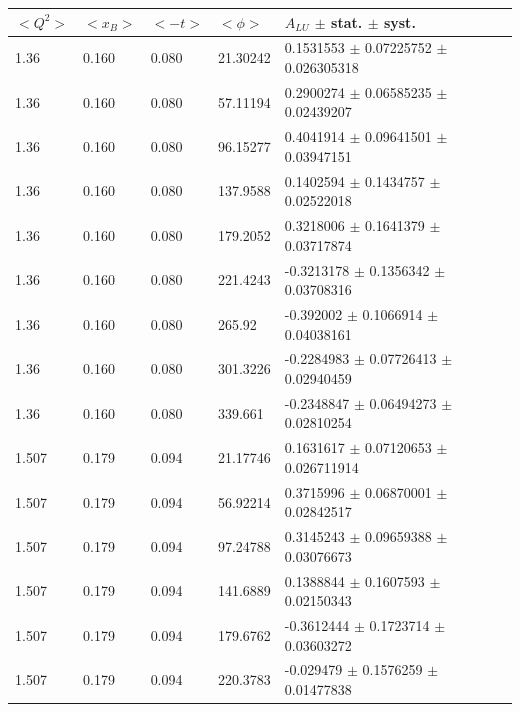\begin{table}[!h]
   \begin{center}
      \begin{tabular}{||l|l|l|l|l||}
         \hline
 $<Q^{2}>$ & $<x_{B}>$ & $<-t>$ & $<\phi>$ & $A_{LU}$ $\pm$ stat. $\pm$ syst.\\

         \hline
           1.36 & 0.160 & 0.080 &   21.30242  &  0.1531553   $\pm$  0.07225752   $\pm$  0.026305318    \\
           1.36 & 0.160 & 0.080 &   57.11194  &  0.2900274   $\pm$  0.06585235   $\pm$  0.02439207     \\
           1.36 & 0.160 & 0.080 &   96.15277  &  0.4041914   $\pm$  0.09641501   $\pm$  0.03947151     \\
           1.36 & 0.160 & 0.080 &   137.9588  &  0.1402594   $\pm$  0.1434757    $\pm$  0.02522018     \\
           1.36 & 0.160 & 0.080 &   179.2052  &  0.3218006   $\pm$  0.1641379    $\pm$  0.03717874     \\
           1.36 & 0.160 & 0.080 &   221.4243  &  -0.3213178  $\pm$  0.1356342    $\pm$  0.03708316     \\
           1.36 & 0.160 & 0.080 &   265.92    &  -0.392002   $\pm$  0.1066914    $\pm$  0.04038161     \\
           1.36 & 0.160 & 0.080 &   301.3226  &  -0.2284983  $\pm$  0.07726413   $\pm$  0.02940459     \\
           1.36 & 0.160 & 0.080 &   339.661   &  -0.2348847  $\pm$  0.06494273   $\pm$  0.02810254     \\
         \hline                                                                         
           1.507 & 0.179 & 0.094 &  21.17746   & 0.1631617   $\pm$  0.07120653   $\pm$  0.026711914     \\
           1.507 & 0.179 & 0.094 &  56.92214   & 0.3715996   $\pm$  0.06870001   $\pm$  0.02842517      \\
           1.507 & 0.179 & 0.094 &  97.24788   & 0.3145243   $\pm$  0.09659388   $\pm$  0.03076673      \\
           1.507 & 0.179 & 0.094 &  141.6889   & 0.1388844   $\pm$  0.1607593    $\pm$  0.02150343      \\
           1.507 & 0.179 & 0.094 &  179.6762   & -0.3612444  $\pm$  0.1723714    $\pm$  0.03603272      \\
           1.507 & 0.179 & 0.094 &  220.3783   & -0.029479   $\pm$  0.1576259    $\pm$  0.01477838      \\

\end{tabular}
\end{center}
\end{table}
